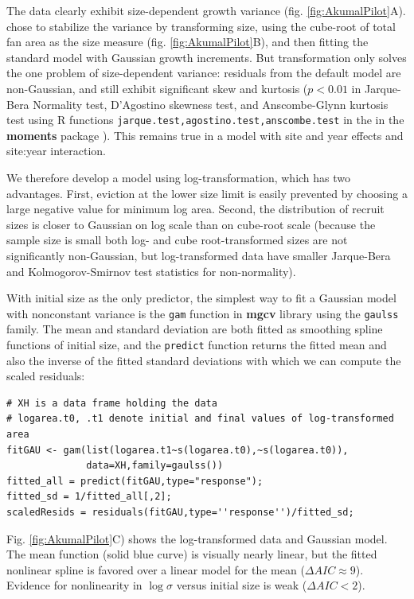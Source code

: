 \documentclass[11pt]{article}
\begin{document}
{The data clearly exhibit size-dependent growth variance (fig. \ref{fig:AkumalPilot}A). 
\citet{bruno-etal-2011} chose to stabilize the variance by transforming size,
using the cube-root of total fan area as the size measure (fig. \ref{fig:AkumalPilot}B), and then fitting the standard 
model with Gaussian growth increments. But transformation only solves the one problem of size-dependent variance: residuals from 
the default model are non-Gaussian, and still exhibit significant skew and kurtosis ($p<0.01$ in Jarque-Bera Normality test, D'Agostino skewness test, 
and Anscombe-Glynn kurtosis test using R functions \texttt{jarque.test,agostino.test,anscombe.test} in the 
in the \textbf{moments} package \citep{komsta-2015}). This remains true in a model with site and year effects and 
site:year interaction. 

We therefore develop a model using log-transformation, which has two advantages. First, eviction at the lower size limit is
easily prevented by choosing a large negative value for minimum log area. Second, the distribution of recruit sizes is closer to Gaussian
on log scale than on cube-root scale (because the sample size is small both log- and cube root-transformed sizes are not significantly
non-Gaussian, but log-transformed data have smaller Jarque-Bera and Kolmogorov-Smirnov test statistics for non-normality). 

With initial size as the only predictor, the simplest way to fit a Gaussian model with nonconstant variance is the
\texttt{gam} function in \textbf{mgcv} library \citep{wood-2017} using the \texttt{gaulss} family. The mean and 
standard deviation are both fitted as smoothing spline functions of initial size, and the \texttt{predict} function
returns the fitted mean and also the inverse of the fitted standard deviations with which we can compute the scaled residuals: 
\begin{lstlisting}
# XH is a data frame holding the data
# logarea.t0, .t1 denote initial and final values of log-transformed area   
fitGAU <- gam(list(logarea.t1~s(logarea.t0),~s(logarea.t0)),
              data=XH,family=gaulss())
fitted_all = predict(fitGAU,type="response"); 
fitted_sd = 1/fitted_all[,2]; 
scaledResids = residuals(fitGAU,type=''response'')/fitted_sd;  
\end{lstlisting}
Fig. \ref{fig:AkumalPilot}C) shows the log-transformed data and Gaussian model. The mean function (solid blue curve) 
is visually nearly linear, but the fitted nonlinear spline is favored over a linear model for the mean ($\Delta AIC \approx 9$). 
Evidence for nonlinearity in $\log \sigma$ versus initial size is weak ($\Delta AIC <2$). 

}
\end{document}

